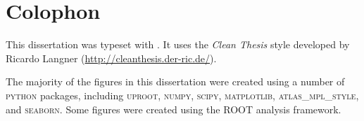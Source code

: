 %
\pagestyle{empty}
\hfill
\vfill
{}
\section*{Colophon}

This dissertation was typeset with \LaTeXe.
It uses the \textit{Clean Thesis} style developed by Ricardo Langner (\url{http://cleanthesis.der-ric.de/}).

The majority of the figures in this dissertation were created using a number of \textsc{python} packages, including \textsc{uproot}, \textsc{numpy}, \textsc{scipy}, \textsc{matplotlib}, \textsc{atlas\_mpl\_style}, and \textsc{seaborn}. Some figures were created using the \textsc{ROOT} analysis framework.
